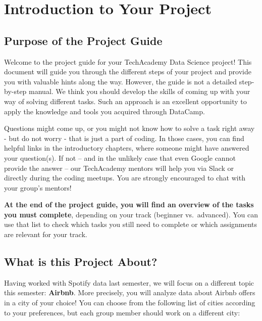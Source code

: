 \documentclass[
  11pt,
]{article}
\begin{document}
\hypertarget{introduction-to-your-project}{%
\section{Introduction to Your Project}\label{introduction-to-your-project}}

\hypertarget{purpose-of-the-project-guide}{%
\subsection{Purpose of the Project Guide}\label{purpose-of-the-project-guide}}

Welcome to the project guide for your TechAcademy Data Science project!
This document will guide you through the different steps of your project and provide you with valuable hints along the way.
However, the guide is not a detailed step-by-step manual.
We think you should develop the skills of coming up with your way of solving different tasks.
Such an approach is an excellent opportunity to apply the knowledge and tools you acquired through DataCamp.

Questions might come up, or you might not know how to solve a task right away - but do not worry - that is just a part of coding.
In those cases, you can find helpful links in the introductory chapters, where someone might have answered your question(s).
If not -- and in the unlikely case that even Google cannot provide the answer -- our TechAcademy mentors will help you via Slack or directly during the coding meetups.
You are strongly encouraged to chat with your group's mentors!

\textbf{At the end of the project guide, you will find an overview of the tasks you must complete}, depending on your track (beginner vs.~advanced).
You can use that list to check which tasks you still need to complete or which assignments are relevant for your track.

\hypertarget{what-is-this-project-about}{%
\subsection{What is this Project About?}\label{what-is-this-project-about}}

Having worked with Spotify data last semester, we will focus on a different topic this semester: \textbf{Airbnb}.
More precisely, you will analyze data about Airbnb offers in a city of your choice!
You can choose from the following list of cities according to your preferences, but each group member should work on a different city:
\end{document}
